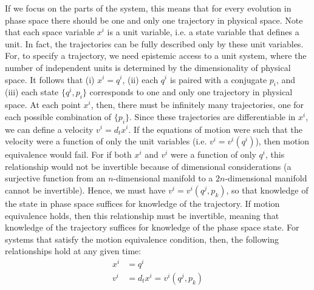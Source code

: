 \documentclass[letterpaper]{article}
\begin{document}
If we focus on the parts of the system, this means that for every evolution in phase space there should be one and only one trajectory in physical space. Note that each space variable $x^i$ is a unit variable, i.e. a state variable that defines a unit. In fact, the trajectories can be fully described only by these unit variables. For, to specify a trajectory, we need epistemic access to a unit system, where the number of independent units is determined by the dimensionality of physical space. It follows that (i) $x^i = q^i$, (ii) each $q^i$ is paired with a conjugate $p_i$, and (iii) each state $\{q^i, p_i\}$ corresponds to one and only one trajectory in physical space. At each point $x^i$, then, there must be infinitely many trajectories, one for each possible combination of $\{p_i\}$. Since these trajectories are differentiable in $x^i$, we can define a velocity $v^i = d_t x^i$. If the equations of motion were such that the velocity were a function of only the unit variables (i.e. $v^i=v^i(q^i)$), then motion equivalence would fail. For if both $x^i$ and $v^i$ were a function of only $q^i$, this relationship would not be invertible because of dimensional considerations (a surjective function from an $n$-dimensional manifold to a $2n$-dimensional manifold cannot be invertible). Hence, we must have $v^i=v^i(q^j, p_k)$, so that knowledge of the state in phase space suffices for knowledge of the trajectory. If motion equivalence holds, then this relationship must be invertible, meaning that knowledge of the trajectory suffices for knowledge of the phase space state. For systems that satisfy the motion equivalence condition, then, the following relationships hold at any given time:
\begin{equation}\label{weak_equivalence}
\begin{aligned}
x^i &= q^i \\
v^i &= d_t x^i = v^i(q^j, p_k)
\end{aligned}
\end{equation}
\end{document}
